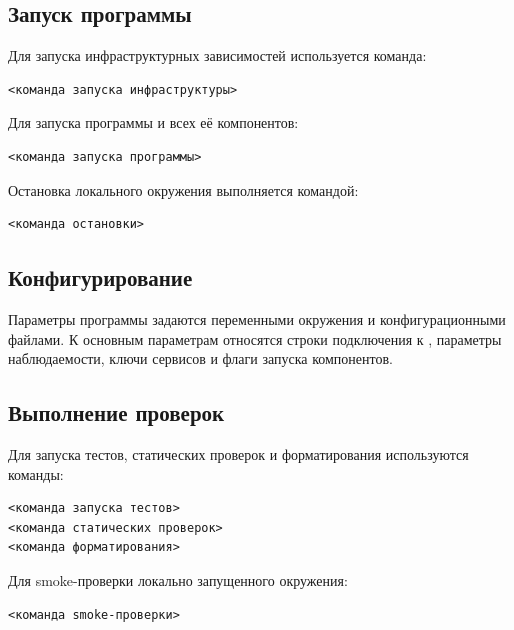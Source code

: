 \documentclass[12pt,a4paper]{extarticle}
\begin{document}
\subsection{Запуск программы}

\begin{hseExample}
Для запуска инфраструктурных зависимостей используется команда:

\begin{verbatim}
<команда запуска инфраструктуры>
\end{verbatim}

Для запуска программы и всех её компонентов:

\begin{verbatim}
<команда запуска программы>
\end{verbatim}

Остановка локального окружения выполняется командой:

\begin{verbatim}
<команда остановки>
\end{verbatim}
\end{hseExample}

\subsection{Конфигурирование}

\begin{hseExample}
Параметры программы задаются переменными окружения и конфигурационными файлами. К основным параметрам относятся строки подключения к , параметры наблюдаемости, ключи сервисов и флаги запуска компонентов.
\end{hseExample}

\subsection{Выполнение проверок}

\begin{hseExample}
Для запуска тестов, статических проверок и форматирования используются команды:

\begin{verbatim}
<команда запуска тестов>
<команда статических проверок>
<команда форматирования>
\end{verbatim}

Для smoke-проверки локально запущенного окружения:

\begin{verbatim}
<команда smoke-проверки>
\end{verbatim}
\end{hseExample}
\end{document}
